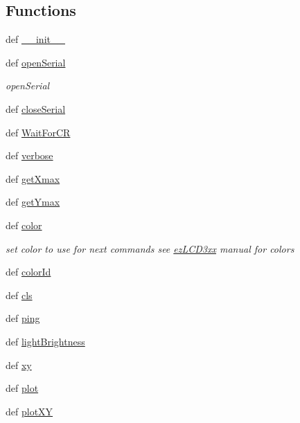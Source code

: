 \subsection*{Functions}
\begin{DoxyCompactItemize}
\item 
def \hyperlink{namespaceez_l_c_d3xx_a222407eee66a635a2df59ffd7b9c4252}{\-\_\-\-\_\-init\-\_\-\-\_\-}
\item 
def \hyperlink{namespaceez_l_c_d3xx_ae43124104a126749f7775a77e5339ce6}{open\-Serial}
\begin{DoxyCompactList}\small\item\em open\-Serial \end{DoxyCompactList}\item 
def \hyperlink{namespaceez_l_c_d3xx_ac758f44d3aa2892d8946d422282c800c}{close\-Serial}
\item 
def \hyperlink{namespaceez_l_c_d3xx_a685d0b172e0c0099f6dda0fbc4d820ad}{Wait\-For\-C\-R}
\item 
def \hyperlink{namespaceez_l_c_d3xx_aa497e8573c045944d589b17fd7dd36ac}{verbose}
\item 
def \hyperlink{namespaceez_l_c_d3xx_ad59d1a1be500396637ab3a9af458137b}{get\-Xmax}
\item 
def \hyperlink{namespaceez_l_c_d3xx_a0f93ca5a289cbd9f7bded58ec120b6a9}{get\-Ymax}
\item 
def \hyperlink{namespaceez_l_c_d3xx_a306a0e99b15bc1122683a1c6e18e7ef0}{color}
\begin{DoxyCompactList}\small\item\em set color to use for next commands see \hyperlink{namespaceez_l_c_d3xx}{ez\-L\-C\-D3xx} manual for colors \end{DoxyCompactList}\item 
def \hyperlink{namespaceez_l_c_d3xx_a94dd8d046a01670fc2212b548e29e8d0}{color\-Id}
\item 
def \hyperlink{namespaceez_l_c_d3xx_acdfb97b09494d0e3cec787014c4863f9}{cls}
\item 
def \hyperlink{namespaceez_l_c_d3xx_a92454899475445ff2d48eb7072f3c94e}{ping}
\item 
def \hyperlink{namespaceez_l_c_d3xx_ae9e977597ff026899a9c5391f915555a}{light\-Brightness}
\item 
def \hyperlink{namespaceez_l_c_d3xx_af249f02b6ad4e734ffa9d8371f6cab8a}{xy}
\item 
def \hyperlink{namespaceez_l_c_d3xx_ad3c0ce418a0feea4a0fa40f803c90196}{plot}
\item 
def \hyperlink{namespaceez_l_c_d3xx_afd55e50562b0dbaf8266eed0901de900}{plot\-X\-Y}

\end{DoxyCompactItemize}
